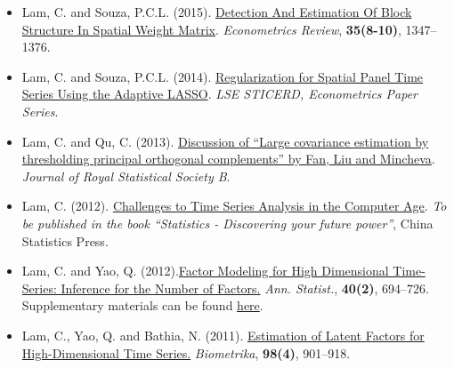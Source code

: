 \documentclass[overlapped,line,letterpaper]{res}
\begin{document}
\begin{resume}
\begin{itemize}
\vspace{12pt}



\item[$\bullet$] Lam, C. and Souza, P.C.L. (2015).
\href{https://cliffordlam.github.io/files/SpatialBlock_rev2.pdf}{Detection And Estimation Of Block Structure In Spatial
Weight Matrix}. {\em Econometrics Review}, {\bf 35(8-10)}, 1347--1376.

\vspace{12pt}

\item[$\bullet$] Lam, C. and Souza, P.C.L. (2014).
\href{https://cliffordlam.github.io/files/RSPT.pdf}{Regularization for Spatial Panel Time Series Using the Adaptive LASSO}. {\em LSE STICERD, Econometrics Paper Series}.

\vspace{12pt}

\item[$\bullet$] Lam, C. and Qu, C. (2013). \href{https://cliffordlam.github.io/files/POETdiscussion.pdf}{Discussion of ``Large covariance estimation by thresholding
principal orthogonal complements'' by Fan, Liu and Mincheva}. {\em Journal of Royal Statistical Society B}.



\vspace{12pt}
\item[$\bullet$] Lam, C. (2012). \href{https://cliffordlam.github.io/files/bookarticle1.pdf}{Challenges to Time Series Analysis in the
Computer Age}. {\em To be published in the book ``Statistics - Discovering your future power''}, China Statistics Press.\\

\vspace{12pt}
\item[$\bullet$] Lam, C. and Yao, Q. (2012).\href{https://cliffordlam.github.io/files/20thdoc.pdf}
{Factor Modeling for High Dimensional Time-Series: Inference for the Number of Factors.}
{\em Ann. Statist.}, {\bf 40(2)}, 694--726. Supplementary materials can be found \href{https://cliffordlam.github.io/files/Supp.pdf}{here}.\\


\vspace{12pt}
\item[$\bullet$] Lam, C., Yao, Q. and Bathia, N. (2011).
\href{https://cliffordlam.github.io/files/7th-1.pdf
}{Estimation of Latent
Factors for High-Dimensional Time Series.}
{\em Biometrika}, {\bf 98(4)}, 901--918.\\



\end{itemize}
\end{resume}
\end{document}
